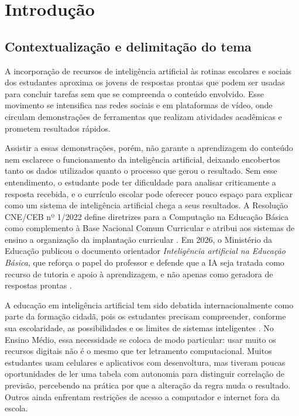\chapter{Introdução}

\section{Contextualização e delimitação do tema}

A incorporação de recursos de inteligência artificial às rotinas escolares e sociais dos estudantes aproxima os jovens de respostas prontas que podem ser usadas para concluir tarefas sem que se compreenda o conteúdo envolvido. Esse movimento se intensifica nas redes sociais e em plataformas de vídeo, onde circulam demonstrações de ferramentas que realizam atividades acadêmicas e prometem resultados rápidos.

Assistir a essas demonstrações, porém, não garante a aprendizagem do conteúdo nem esclarece o funcionamento da inteligência artificial, deixando encobertos tanto os dados utilizados quanto o processo que gerou o resultado. Sem esse entendimento, o estudante pode ter dificuldade para analisar criticamente a resposta recebida, e o currículo escolar pode oferecer pouco espaço para explicar como um sistema de inteligência artificial chega a seus resultados. A Resolução CNE/CEB nº 1/2022 define diretrizes para a Computação na Educação Básica como complemento à Base Nacional Comum Curricular e atribui aos sistemas de ensino a organização da implantação curricular \cite{brasil2022computacao}. Em 2026, o Ministério da Educação publicou o documento orientador \textit{Inteligência artificial na Educação Básica}, que reforça o papel do professor e defende que a IA seja tratada como recurso de tutoria e apoio à aprendizagem, e não apenas como geradora de respostas prontas \cite{brasil2026iaeducacaobasica}.

A educação em inteligência artificial tem sido debatida internacionalmente como parte da formação cidadã, pois os estudantes precisam compreender, conforme sua escolaridade, as possibilidades e os limites de sistemas inteligentes \cite{touretzky2019envisioning}. No Ensino Médio, essa necessidade se coloca de modo particular: usar muito os recursos digitais não é o mesmo que ter letramento computacional. Muitos estudantes usam celulares e aplicativos com desenvoltura, mas tiveram poucas oportunidades de ler uma tabela com autonomia para distinguir correlação de previsão, percebendo na prática por que a alteração da regra muda o resultado. Outros ainda enfrentam restrições de acesso a computador e internet fora da escola.

